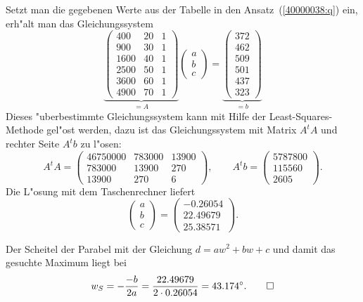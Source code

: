 \begin{loesung}
\begin{teilaufgaben}
\item
Setzt man die gegebenen Werte aus der Tabelle in den Ansatz~(\ref{40000038:q})
ein, erh"alt man das Gleichungssystem
\[
\underbrace{
\begin{pmatrix}
 400&20&1\\
 900&30&1\\
1600&40&1\\
2500&50&1\\
3600&60&1\\
4900&70&1
\end{pmatrix}}_{\displaystyle = A}
\begin{pmatrix}
a\\
b\\
c
\end{pmatrix}
=
\underbrace{
\begin{pmatrix}
372\\
462\\
509\\
501\\
437\\
323
\end{pmatrix}}_{\displaystyle = b}
\]
Dieses "uberbestimmte Gleichungssystem kann mit Hilfe der
Least-Squares-Methode gel"ost werden, dazu ist das Gleichungssystem
mit Matrix $A^tA$ und rechter Seite $A^tb$ zu l"osen:
\[
A^tA
=
\begin{pmatrix}
46750000&783000&13900\\
  783000& 13900&  270\\
   13900&   270&    6
\end{pmatrix},
\qquad
A^tb
=
\begin{pmatrix}
5787800\\
 115560\\
   2605
\end{pmatrix}.
\]
Die L"osung mit dem Taschenrechner liefert
\[
\begin{pmatrix}
a\\b\\c
\end{pmatrix}
=
\begin{pmatrix}
-0.26054\\
22.49679\\
25.38571
\end{pmatrix}.
\]
\item
Der Scheitel der Parabel mit der Gleichung $d=aw^2 + bw+c$
und damit das gesuchte Maximum liegt bei
\[
w_S=-\frac{-b}{2a}=\frac{22.49679}{2\cdot 0.26054}=43.174^\circ.
\qedhere
\]
\end{teilaufgaben}
\end{loesung}

